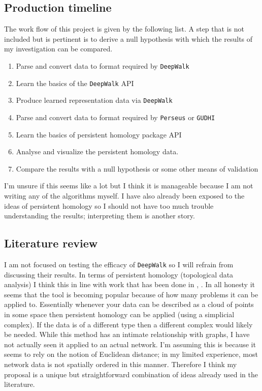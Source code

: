 \documentclass[letter,10pt,openany]{article}
\begin{document}
\subsection{Production timeline}
The work flow of this project is given by the following list. A step
that is not included but is pertinent is to derive a null hypothesis
with which the results of my investigation can be compared.
\begin{enumerate}
\item Parse and convert data to format required by \texttt{DeepWalk}
\item Learn the basics of the \texttt{DeepWalk} API
\item Produce learned representation data via \texttt{DeepWalk}
\item Parse and convert data to format required by \texttt{Perseus} or \texttt{GUDHI}
\item Learn the basics of persistent homology package API
\item Analyse and visualize the persistent homology data.
\item Compare the results with a null hypothesis or some other
means of validation
\end{enumerate}
I'm unsure if this seems like a lot but I think it is manageable because I am
not writing any of the algorithms myself. I have also already been exposed to
the ideas of persistent homology so I should not have too much trouble
understanding the results; interpreting them is another story.

\subsection{Literature review}
I am not focused on testing the efficacy of \texttt{DeepWalk} so I will
refrain from discussing their results. In terms of persistent homology (topological data
analysis) I think this in line with work that has been done in \cite{Topaz}, \cite{ComplexNetworks}.
In all honesty it seems that the tool is becoming popular because of how many problems it
can be applied to. Essentially whenever your data can be described as a cloud of points
in some space then persistent homology can be applied (using a simplicial complex). If the data
is of a different type then a different complex would likely be needed. While this method
has an intimate relationship with graphs, I have not actually seen it applied to an actual network.
I'm assuming this is because it seems to rely on the notion of Euclidean distance; in my limited
experience, most network data is not spatially ordered in this manner.
Therefore I think my proposal is a unique but straightforward combination
of ideas already used in the literature.
\end{document}
